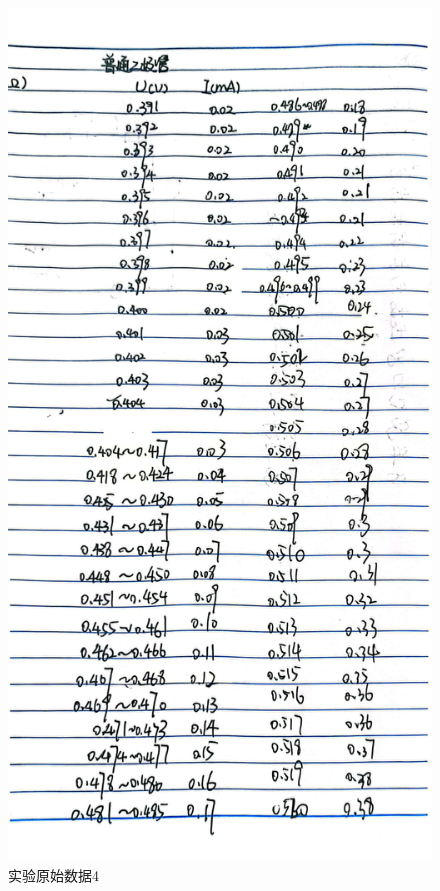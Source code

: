 \documentclass{ctexart}
\begin{document}
\begin{figure}[H]
  \centering
  \includegraphics[width=1\textwidth,height=0.8\textheight]{putong1.jpg}
  \caption{实验原始数据4}\label{putong1}
\end{figure}
\newpage
\end{document}
